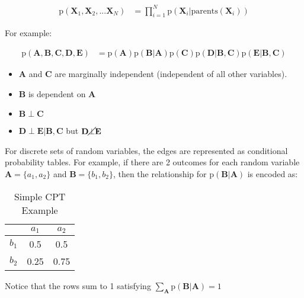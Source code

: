 \documentclass[11pt]{article}
\newcommand{\SetOf}[1]{\mathbf{#1}} %
\newcommand{\prob}[1]{\text{p}(#1)} %
\newcommand{\Eq}[1]{\begin{align*}#1\end{align*}} %
\begin{document}
	\Eq{\prob{\SetOf{X}_1,\SetOf{X}_2,...\SetOf{X}_N}&= \prod_{i=1}^N \prob{\SetOf{X}_i|\text{parents}(\SetOf{X}_i)}}

	For example:

	\begin{center}
	\end{center}

	\Eq{\prob{\SetOf{A},\SetOf{B},\SetOf{C},\SetOf{D},\SetOf{E}} &= \prob{\SetOf{A}}\prob{\SetOf{B}|\SetOf{A}}\prob{\SetOf{C}}\prob{\SetOf{D}|\SetOf{B},\SetOf{C}}\prob{\SetOf{E}|\SetOf{B},\SetOf{C}}}

	\begin{itemize}
		\item $\SetOf{A}$ and $\SetOf{C}$ are marginally independent (independent of all other variables).
		\item $\SetOf{B}$ is dependent on $\SetOf{A}$
		\item $\SetOf{B} \perp \SetOf{C}$
		\item $\SetOf{D} \perp \SetOf{E} | \SetOf{B}, \SetOf{C}$ but $\SetOf{D} \cancel{\perp} \SetOf{E}$
	\end{itemize}

	For discrete sets of random variables, the edges are represented as conditional probability tables. For example, if there are 2 outcomes for each random variable $\SetOf{A} = \{a_1, a_2\}$ and $\SetOf{B} = \{b_1,b_2\}$, then the relationship for $\prob{\SetOf{B}|\SetOf{A}}$ is encoded as:

	\begin{table}[h]
		\caption{Simple CPT Example}
		\centering
		\begin{tabular}{c|c c} %
			& $a_1$ & $a_2$\\
			\hline
			$b_1$ & 0.5 & 0.5\\
			$b_2$ & 0.25& 0.75
		\end{tabular}
	\end{table}

	Notice that the rows sum to 1 satisfying $\sum_{\SetOf{A}} \prob{\SetOf{B|\SetOf{A}}} = 1$
 
\end{document}
